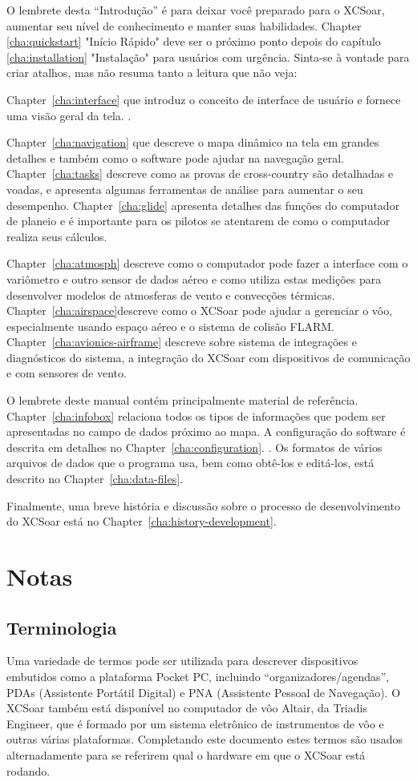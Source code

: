 O lembrete desta “Introdução” é para deixar você preparado para o XCSoar, aumentar seu nível de conhecimento e manter suas habilidades.   
Chapter \ref{cha:quickstart} "Início Rápido" deve ser o próximo ponto depois do capítulo 
\ref{cha:installation} "Instalação" para usuários com urgência. Sinta-se à vontade para criar atalhos, mas não resuma tanto a leitura que não veja:

Chapter~\ref{cha:interface} que introduz o conceito de interface de usuário e fornece uma visão geral da tela. .

Chapter~\ref{cha:navigation} que descreve o mapa dinâmico na tela em grandes detalhes e também como o software pode ajudar na navegação geral.  Chapter~\ref{cha:tasks} descreve como as provas de cross-country são detalhadas e voadas, e apresenta algumas ferramentas de análise para aumentar o seu desempenho.
Chapter~\ref{cha:glide} apresenta detalhes das funções do computador de planeio e é importante para os pilotos se atentarem de como o computador realiza seus cálculos.

Chapter~\ref{cha:atmosph} descreve como o computador pode fazer a interface com o variômetro e outro sensor de dados aéreo e como utiliza estas medições para desenvolver modelos de atmosferas de vento e convecções térmicas.  
Chapter~\ref{cha:airspace}descreve como o XCSoar pode ajudar a gerenciar o vôo, especialmente usando espaço aéreo e o sistema de colisão FLARM.  Chapter~\ref{cha:avionics-airframe} descreve sobre sistema de integrações e diagnósticos do sistema, a integração do XCSoar com dispositivos de comunicação e com sensores de vento.

O lembrete deste manual contém principalmente material de referência.  
Chapter~\ref{cha:infobox} relaciona todos os tipos de informações que podem ser apresentadas no campo de dados próximo ao mapa.  A configuração do software é descrita em detalhes no
Chapter~\ref{cha:configuration}.  .  Os formatos de vários arquivos de dados que o programa usa, bem como obtê-los e editá-los, está descrito no Chapter~\ref{cha:data-files}.

Finalmente, uma breve história e discussão sobre o processo de desenvolvimento do XCSoar está no Chapter~\ref{cha:history-development}.

\section{Notas}

\subsection*{Terminologia}
Uma variedade de termos pode ser utilizada para descrever dispositivos embutidos como a plataforma Pocket PC, incluindo “organizadores/agendas”,   PDAs (Assistente Portátil Digital) e PNA (Assistente Pessoal de Navegação).  O XCSoar também está disponível no computador de vôo Altair, da Triadis Engineer, que é formado por um sistema eletrônico de instrumentos de vôo e outras várias plataformas.  
Completando este documento estes termos são usados alternadamente para se referirem qual o hardware em que o XCSoar está rodando.


